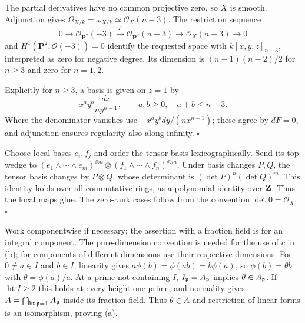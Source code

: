 \documentclass[11pt]{article}
\let\chapterexercise\exercise
\renewcommand{\exercise}[2]{\Needspace{8\baselineskip}\chapterexercise{#1}{#2}}
\begin{document}
\pf
The partial derivatives have no common projective zero, so $X$ is smooth. Adjunction gives $\Omega_{X/k}=\omega_{X/k}\simeq\mathcal O_X(n-3)$. The restriction sequence
\[ 0\to\mathcal O_{\mathbf P^2}(-3)\xrightarrow{F}\mathcal O_{\mathbf P^2}(n-3)\to\mathcal O_X(n-3)\to0 \]
and $H^1(\mathbf P^2,\mathcal O(-3))=0$ identify the requested space with $k[x,y,z]_{n-3}$, interpreted as zero for negative degree. Its dimension is $(n-1)(n-2)/2$ for $n\ge3$ and zero for $n=1,2$.

Explicitly for $n\ge3$, a basis is given on $z=1$ by
\[ x^ay^b\frac{dx}{n y^{n-1}},\qquad a,b\ge0,\quad a+b\le n-3. \]
Where the denominator vanishes use $-x^ay^bdy/(n x^{n-1})$; these agree by $dF=0$, and adjunction ensures regularity also along infinity. \hfill$\square$

\pf
Choose local bases $e_i,f_j$ and order the tensor basis lexicographically. Send its top wedge to $(e_1\wedge\cdots\wedge e_m)^{\otimes n}\otimes(f_1\wedge\cdots\wedge f_n)^{\otimes m}$. Under basis changes $P,Q$, the tensor basis changes by $P\otimes Q$, whose determinant is $(\det P)^n(\det Q)^m$. This identity holds over all commutative rings, as a polynomial identity over $\mathbf Z$. Thus the local maps glue. The zero-rank cases follow from the convention $\det0=\mathcal O_X$. \hfill$\square$

\pf
Work componentwise if necessary; the assertion with a fraction field is for an integral component. The pure-dimension convention is needed for the use of $c$ in (b); for components of different dimensions use their respective dimensions. For $0\ne a\in I$ and $b\in I$, linearity gives $a\phi(b)=\phi(ab)=b\phi(a)$, so $\phi(b)=\theta b$ with $\theta=\phi(a)/a$. At a prime not containing $I$, $I_\mathfrak p=A_\mathfrak p$ implies $\theta\in A_\mathfrak p$. If $\operatorname{ht}I\ge2$ this holds at every height-one prime, and normality gives $A=\bigcap_{\operatorname{ht}\mathfrak p=1}A_\mathfrak p$ inside its fraction field. Thus $\theta\in A$ and restriction of linear forms is an isomorphism, proving (a).
\end{document}
